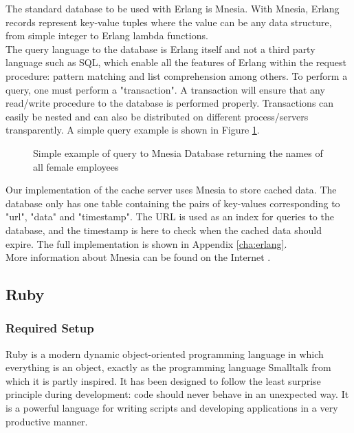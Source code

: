 The standard database to be used with Erlang is Mnesia. With Mnesia, Erlang records represent key-value tuples where the value can be any data structure, from simple integer to Erlang lambda functions.\\

The query language to the database is Erlang itself and not a third party language such as SQL, which enable all the features of Erlang within the request procedure: pattern matching and list comprehension among others. To perform a query, one must perform a "transaction". A transaction will ensure that any read/write procedure to the database is performed properly. Transactions can easily be nested and can also be distributed on different process/servers transparently. A simple query example is shown in Figure \ref{fig:mnesia_example}.\\

\begin{figure}[ht]
  \centering
  \caption{Simple example of query to Mnesia Database returning the names of all female employees}
  \label{fig:mnesia_example}
\end{figure}

Our implementation of the cache server uses Mnesia to store cached data. The database only has one table containing the pairs of key-values corresponding to "url", "data" and "timestamp". The URL is used as an index for queries to the database, and the timestamp is here to check when the cached data should expire. The full implementation is shown in Appendix \ref{cha:erlang}.\\

More information about Mnesia can be found on the Internet \cite{Mne10}.

\subsection{Ruby}

\subsubsection{Required Setup}

Ruby is a modern dynamic object-oriented programming language in which everything is an object, exactly as the programming language Smalltalk from which it is partly inspired. It has been designed to follow the least surprise principle during development: code should never behave in an unexpected way. It is a powerful language for writing scripts and developing applications in a very productive manner.\\


